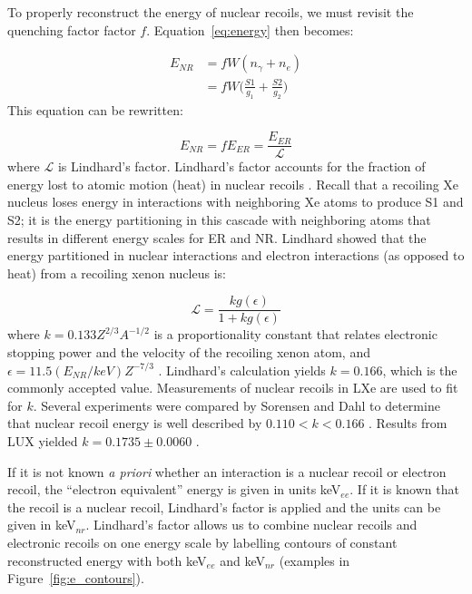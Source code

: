 To properly reconstruct the energy of nuclear recoils, we must revisit the quenching factor factor $f$. Equation~\ref{eq:energy} then becomes:

 \begin{equation}
 \begin{split}
E_{NR} &= f W (n_{\gamma} + n_{e} ) \\
   &= f W \Big(\frac{S1}{g_{1}} + \frac{S2}{g_{2}}\Big)
 \end{split}
\end{equation}
This equation can be rewritten:

 \begin{equation}
 \label{eq:combined_energy}
E_{NR} = f E_{ER} = \frac{E_{ER}}{\mathcal{L}}
\end{equation}
where $\mathcal{L}$ is Lindhard's factor. Lindhard's factor accounts for the fraction of energy lost to atomic motion (heat) in nuclear recoils \cite{Lindhard1963}. Recall that a recoiling Xe nucleus loses energy in interactions with neighboring Xe atoms to produce S1 and S2; it is the energy partitioning in this cascade with neighboring atoms that results in different energy scales for \ac{ER} and \ac{NR}. Lindhard showed that the energy partitioned in nuclear interactions and electron interactions (as opposed to heat) from a recoiling xenon nucleus is:

 \begin{equation}
 \label{eq:lindhard}
\mathcal{L} = \frac{k g(\epsilon)}{1 + k g(\epsilon)}
\end{equation}
where $k = 0.133 Z^{2/3} A^{-1/2}$ is a proportionality constant that relates electronic stopping power and the velocity of the recoiling xenon atom, and $\epsilon = 11.5 (E_{NR}/keV) Z^{-7/3}$ \cite{Lindhard1963}. Lindhard's calculation yields $k=0.166$, which is the commonly accepted value. Measurements of nuclear recoils in \ac{LXe} are used to fit for $k$. Several experiments were compared by Sorensen and Dahl to determine that nuclear recoil energy is well described by $0.110 < k < 0.166$ \cite{Sorensen2011}. Results from \ac{LUX} yielded $k = 0.1735 \pm 0.0060$ \cite{LUXDD}. 

If it is not known \textit{a priori} whether an interaction is a nuclear recoil or electron recoil, the ``electron equivalent'' energy is given in units keV$_{ee}$. If it is known that the recoil is a nuclear recoil, Lindhard's factor is applied and the units can be given in keV$_{nr}$. Lindhard's factor allows us to combine nuclear recoils and electronic recoils on one energy scale by labelling contours of constant reconstructed energy with both keV$_{ee}$ and keV$_{nr}$ (examples in Figure~\ref{fig:e_contours}).


